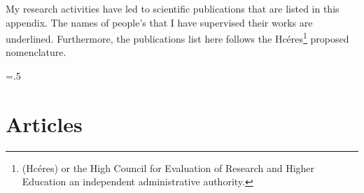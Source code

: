 
My research activities have led to scientific publications that are listed in this appendix.
The names of people's that I have supervised their works are underlined.
Furthermore, the publications list here follows the Hcéres\footnote{ (Hcéres) or the High Council for Evaluation of Research and Higher Education  an independent administrative authority.} proposed nomenclature\;\cite{2018_hceres}.

\sectionskipamount=.5\sectionskipamount


\section[Articles]{Articles}

